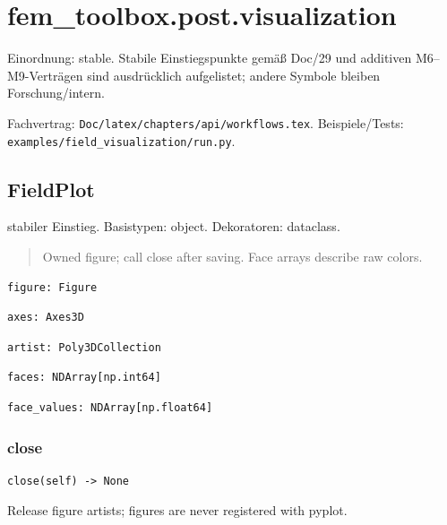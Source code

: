 \section{fem\_toolbox.post.visualization}
Einordnung: stable. Stabile Einstiegspunkte gemäß Doc/29 und additiven M6–M9-Verträgen sind ausdrücklich aufgelistet; andere Symbole bleiben Forschung/intern.
\par Fachvertrag: \nolinkurl{Doc/latex/chapters/api/workflows.tex}. Beispiele/Tests:
\nolinkurl{examples/field_visualization/run.py}.
\subsection{FieldPlot}
stabiler Einstieg.
Basistypen: object. Dekoratoren: dataclass.
\begin{quote}
Owned figure; call close after saving. Face arrays describe raw colors.
\end{quote}
\begin{lstlisting}
figure: Figure
\end{lstlisting}
\begin{lstlisting}
axes: Axes3D
\end{lstlisting}
\begin{lstlisting}
artist: Poly3DCollection
\end{lstlisting}
\begin{lstlisting}
faces: NDArray[np.int64]
\end{lstlisting}
\begin{lstlisting}
face_values: NDArray[np.float64]
\end{lstlisting}
\subsubsection*{close}
\begin{lstlisting}
close(self) -> None
\end{lstlisting}
Release figure artists; figures are never registered with pyplot.
